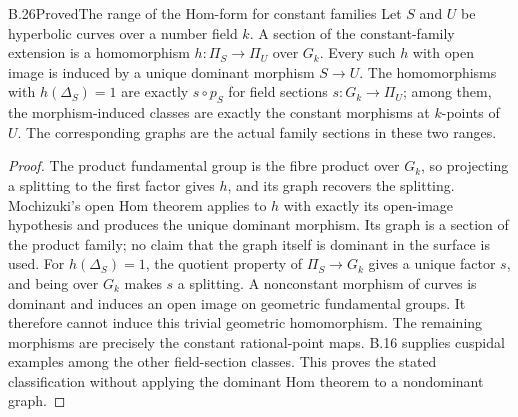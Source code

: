 \begin{statement}{B.26}{Proved}{The range of the Hom-form for constant families}
Let $S$ and $U$ be hyperbolic curves over a number field $k$.
A section of the constant-family extension is a homomorphism
$h:\Pi_S\to\Pi_U$ over $G_k$.  Every such $h$ with open image is
induced by a unique dominant morphism $S\to U$.
The homomorphisms with $h(\Delta_S)=1$ are exactly
$s\circ p_S$ for field sections $s:G_k\to\Pi_U$; among them, the
morphism-induced classes are exactly the constant morphisms at
$k$-points of $U$.  The corresponding graphs are the actual family
sections in these two ranges.
\end{statement}
\begin{proof}
The product fundamental group is the fibre product over $G_k$, so
projecting a splitting to the first factor gives $h$, and its graph
recovers the splitting.  Mochizuki's open Hom theorem applies to
$h$ with exactly its open-image hypothesis and produces the unique
dominant morphism.  Its graph is a section of the product family;
no claim that the graph itself is dominant in the surface is used.
For $h(\Delta_S)=1$, the quotient property of
$\Pi_S\to G_k$ gives a unique factor $s$, and being over $G_k$
makes $s$ a splitting.  A nonconstant morphism of curves is
dominant and induces an open image on geometric fundamental groups.
It therefore cannot induce this trivial geometric homomorphism.
The remaining morphisms are precisely the constant rational-point
maps.  B.16 supplies cuspidal examples among the other field-section
classes.  This proves the stated classification without applying
the dominant Hom theorem to a nondominant graph.
\end{proof}

